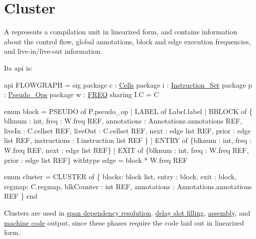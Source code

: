 \section{Cluster}

A 
represents a compilation unit in linearized form,
and contains information about the control flow, global annotations, 
block and edge execution frequencies, and live-in/live-out information.

Its api is:
\begin{SML}
api FLOWGRAPH = sig
  package c : \href{cells.html}{Cells}
  package i : \href{instructions.html}{Instruction_Set}
  package p : \href{pseudo-ops.html}{Pseudo_Ops}
  package w : \href{freq.html}{FREQ}
     sharing I.C = C

  enum block =
      PSEUDO of P.pseudo_op
    | LABEL of Label.label
    | BBLOCK of
        \{ blknum      : int,
          freq        : W.freq REF,
          annotations : Annotations.annotations REF,
	  liveIn      : C.cellset REF,
	  liveOut     : C.cellset REF,
	  next 	      : edge list REF,
	  prior 	      : edge list REF,
	  instructions	      : I.instruction list REF
        \}
    | ENTRY of 
        \{blknum : int, freq : W.freq REF, next : edge list REF\}
    | EXIT of 
        \{blknum : int, freq : W.freq REF, prior : edge list REF\}
  withtype edge = block * W.freq REF

  enum cluster = 
      CLUSTER of \{
        blocks: block list, 
        entry : block,
        exit  : block,	  
        regmap: C.regmap,
        blkCounter : int REF,
        annotations : Annotations.annotations REF
      \}
end
\end{SML}

Clusters are used in
\href{span-dep.html}{span dependency resolution}, 
\href{delayslots.html}{delay slot filling},
\href{asm.html}{assembly}, 
and \href{mc.html}{machine code} 
output, since these phases require the code laid out in linearized form.
